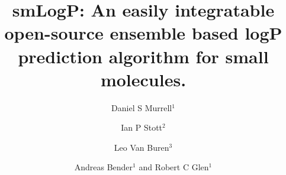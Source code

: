 \documentclass[10pt]{bmc_article}
\newenvironment{bmcformat}{\begin{raggedright}\baselineskip20pt\sloppy\setboolean{publ}{false}}{\end{raggedright}\baselineskip20pt\sloppy}
\begin{document}
\begin{bmcformat}



\title{smLogP: An easily integratable open-source ensemble based logP prediction algorithm for
  small molecules.}
 

\author{Daniel S Murrell$^1$%
        \and
        Ian P Stott$^2$%
       \and
        Leo Van Buren$^3$%
      	\and
         Andreas Bender$^1$%
       and
         Robert C Glen\correspondingauthor$^1$%
      }
      
\address{%
    \iid(1)Unilever Centre for Molecular Science Informatics,
    Department of Chemistry, University of Cambridge, Lensfield Road,
    Cambridge CB2 1EW, UK\\
    \iid(2)Unilever Research, Bebington, UK\\
    \iid(3)Unilever R&D Vlaardingen, Olivier van Noortlaan 120, PO Box 114, 3130 AC Vlaardingen, The Netherlands%
}%

\maketitle 


\end{bmcformat}
\end{document}
